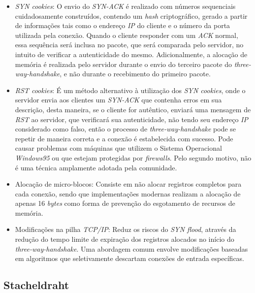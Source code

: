 \begin{itemize}
     \item \textit{SYN cookies}: O envio do \textit{SYN-ACK} é realizado com números sequenciais cuidadosamente construídos, contendo um \textit{hash} criptográfico, gerado a partir de informações tais como o endereço \textit{IP} do cliente e o número da porta utilizada pela conexão. Quando o cliente responder com um \textit{ACK} normal, essa sequência será inclusa no pacote, que será comparada pelo servidor, no intuito de verificar a autenticidade do mesmo. Adicionalmente, a alocação de memória é realizada pelo servidor durante o envio do terceiro pacote do \textit{three-way-handshake}, e não durante o recebimento do primeiro pacote.

    \item \textit{RST cookies}: É um método alternativo à utilização dos \textit{SYN cookies}, onde o servidor envia aos clientes um \textit{SYN-ACK} que contenha erros em sua descrição, desta maneira, se o cliente for autêntico, enviará uma mensagem de \textit{RST} ao servidor, que verificará sua autenticidade, não tendo seu endereço \textit{IP} considerado como falso, então o processo de \textit{three-way-handshake} pode se repetir de maneira correta e a conexão é estabelecida com sucesso. Pode causar problemas com máquinas que utilizem o Sistema Operacional \textit{Windows95} ou que estejam protegidas por \textit{firewalls}. Pelo segundo motivo, não é uma técnica amplamente adotada pela comunidade.

    \item Alocação de micro-blocos: Consiste em não alocar registros completos para cada conexão, sendo que implementações modernas realizam a alocação de apenas 16 \textit{bytes} como forma de prevenção do esgotamento de recursos de memória.

    \item Modificações na pilha \textit{TCP/IP}: Reduz os riscos do \textit{SYN flood}, através da redução do tempo limite de expiração dos registros alocados no início do \textit{three-way-handshake}. Uma abordagem comum envolve modificações baseadas em algoritmos que seletivamente descartam conexões de entrada específicas.
\end{itemize}


\subsection{Stacheldraht}

